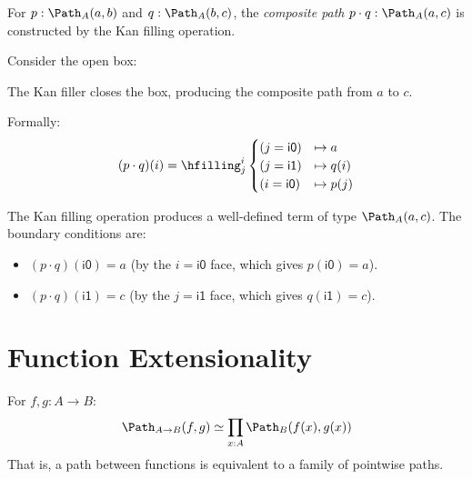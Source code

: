 \begin{definition}
\label{def:composition}
For $p : \Path_A(a, b)$ and $q : \Path_A(b, c)$, the
\emph{composite path} $p \cdot q : \Path_A(a, c)$ is constructed
by the Kan filling operation.

Consider the open box:
\begin{center}
\end{center}

The Kan filler closes the box, producing the composite path from $a$
to $c$.

Formally:
\[
  (p \cdot q)(i) = \hfilling^i_{j}
    \begin{cases}
      (j = \mathsf{i0}) &\mapsto a \\
      (j = \mathsf{i1}) &\mapsto q(i) \\
      (i = \mathsf{i0}) &\mapsto p(j)
    \end{cases}
\]
\end{definition}

\begin{theorem}
The Kan filling operation produces a well-defined term of type
$\Path_A(a, c)$.  The boundary conditions are:
\begin{itemize}
  \item $(p \cdot q)(\mathsf{i0}) = a$ (by the $i = \mathsf{i0}$
    face, which gives $p(\mathsf{i0}) = a$).
  \item $(p \cdot q)(\mathsf{i1}) = c$ (by the $j = \mathsf{i1}$
    face, which gives $q(\mathsf{i1}) = c$).
\end{itemize}
\end{theorem}

\section{Function Extensionality}

\begin{theorem}
\label{thm:funext}
For $f, g : A \to B$:
\[
  \Path_{A \to B}(f, g) \simeq \prod_{x : A} \Path_B(f(x), g(x))
\]
That is, a path between functions is equivalent to a family of
pointwise paths.
\end{theorem}

